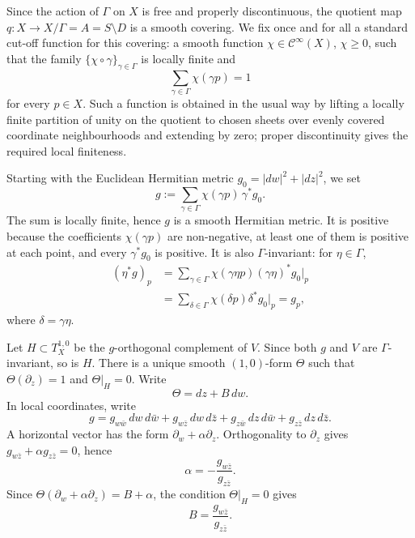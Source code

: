 \documentclass[10pt,a4paper]{amsart}
\numberwithin{equation}{section}
\begin{document}
Since the action of $\Gamma$ on $X$ is free and properly discontinuous, the
quotient map $q:X\to X/\Gamma=A=S\setminus D$ is a smooth covering. We fix once and for all a standard cut-off function for this covering: a smooth function
$\chi\in\mathcal C^\infty(X)$, $\chi\geq0$, such that the family
$\{\chi\circ\gamma\}_{\gamma\in\Gamma}$ is locally finite and
\begin{equation}\label{eq:cutoff-sum}
 \sum_{\gamma\in\Gamma} \chi(\gamma p)=1
\end{equation}
for every $p\in X$. Such a function is obtained in the usual way by lifting a locally
finite partition of unity on the quotient to chosen sheets over evenly covered
coordinate neighbourhoods and extending by zero; proper discontinuity gives
the required local finiteness.

Starting with the Euclidean Hermitian metric $g_0=|dw|^2+|dz|^2$, we set
\begin{equation*}
 g:=\sum_{\gamma\in\Gamma}\chi(\gamma p)\,\gamma^*g_0.
\end{equation*}
The sum is locally finite, hence $g$ is a smooth Hermitian metric. It is positive because the coefficients $\chi(\gamma p)$ are non-negative, at least
one of them is positive at each point, and every $\gamma^*g_0$ is positive.
It is also $\Gamma$-invariant: for $\eta\in\Gamma$,
\begin{align*}
 (\eta^*g)_p
 &=
 \sum_{\gamma\in\Gamma}\chi(\gamma\eta p)(\gamma\eta)^*g_0|_p \\
 &=
 \sum_{\delta\in\Gamma}\chi(\delta p)\delta^*g_0|_p
 =
 g_p,
\end{align*}
where $\delta=\gamma\eta$.

Let $H\subset T_X^{1,0}$ be the $g$-orthogonal complement of $V$. Since
both $g$ and $V$ are $\Gamma$-invariant, so is $H$. There is a unique
smooth $(1,0)$-form $\Theta$ such that $\Theta(\partial_z)=1$ and $\Theta|_H=0$. Write
\begin{equation*}
 \Theta=dz+B\,dw.
\end{equation*}
In local coordinates, write
\begin{equation*}
 g
 =
 g_{w\bar w}\,dw\,d\bar w
 +
 g_{w\bar z}\,dw\,d\bar z
 +
 g_{z\bar w}\,dz\,d\bar w
 +
 g_{z\bar z}\,dz\,d\bar z.
\end{equation*}
A horizontal vector has the form $\partial_w+\alpha\partial_z$. Orthogonality
to $\partial_z$ gives $g_{w\bar z}+\alpha g_{z\bar z}=0$, hence
$$ \alpha=-\frac{g_{w\bar z}}{g_{z\bar z}}. $$
Since $\Theta(\partial_w+\alpha\partial_z)=B+\alpha$, the condition $\Theta|_H=0$ gives
\begin{equation*}
 B=\frac{g_{w\bar z}}{g_{z\bar z}}.
\end{equation*}
\end{document}
